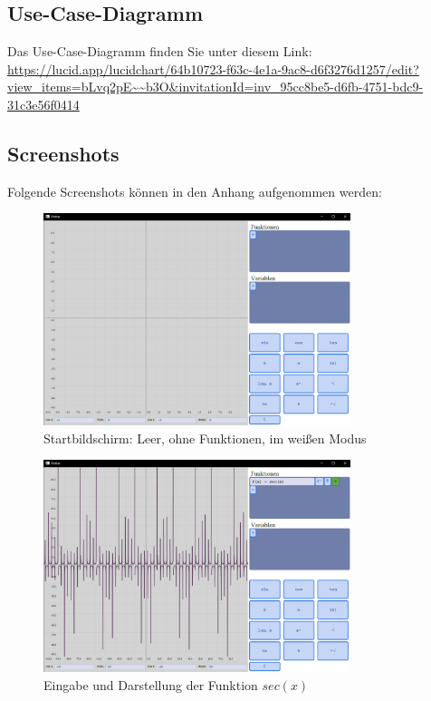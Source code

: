 \documentclass[a4paper]{article}
\begin{document}
\subsection{Use-Case-Diagramm}
Das Use-Case-Diagramm finden Sie unter diesem Link:
\newline
\url{https://lucid.app/lucidchart/64b10723-f63c-4e1a-9ac8-d6f3276d1257/edit?view_items=bLvq2pE~~b3O&invitationId=inv_95cc8be5-d6fb-4751-bdc9-31c3e56f0414}

\clearpage

\subsection{Screenshots}
Folgende Screenshots können in den Anhang aufgenommen werden:
\begin{figure}[ht]
	\centering
	\includegraphics[width=0.8\textwidth]{Resources/startbildschirm.png}
	\caption{Startbildschirm: Leer, ohne Funktionen, im weißen Modus}
	\label{fig:startbildschirm}
\end{figure}

\begin{figure}[ht]
	\centering
	\includegraphics[width=0.8\textwidth]{Resources/eingabe_darstellung.png}
	\caption{Eingabe und Darstellung der Funktion $sec(x)$}
	\label{fig:eingabe_darstellung}
\end{figure}
\end{document}
